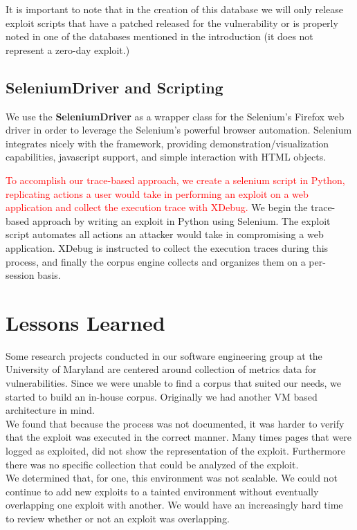 \documentclass[letterpaper,twocolumn,10pt]{article}
\begin{document}
It is important to note that in the creation of this database we will only release exploit scripts that have a patched released for the vulnerability or is properly noted in one of the databases mentioned in the introduction (it does not represent a zero-day exploit.)


\subsection{{\bf SeleniumDriver} and Scripting}
We use the {\bf SeleniumDriver} as a wrapper class for the Selenium's Firefox web driver in order to leverage the Selenium's powerful browser automation.  Selenium integrates nicely with the framework, providing demonstration/visualization capabilities, javascript support, and simple interaction with HTML objects.

\textcolor{red}{To accomplish our trace-based approach, we create a selenium script in Python, replicating actions a user would take in performing an exploit on a web application and collect the execution trace with XDebug.}
We begin the trace-based approach by writing an exploit in Python using Selenium. The exploit script automates all actions an attacker would take in compromising a web application. XDebug is instructed to collect the execution traces during this process, and finally the corpus engine collects and organizes them on a per-session basis.


\section{Lessons Learned}

Some research projects conducted in our software engineering group at the University of Maryland are centered around collection of metrics data for vulnerabilities.  Since we were unable to find a corpus that suited our needs, we started to build an in-house corpus.  Originally we had another VM based architecture in mind. \\

We found that because the process was not documented, it was harder to verify that the exploit was executed in the correct manner.  Many times pages that were logged as exploited, did not show the representation of the exploit.  Furthermore there was no specific collection that could be analyzed of the exploit.\\

We determined that, for one, this environment was not scalable.  We could not continue to add new exploits to a tainted environment without eventually overlapping one exploit with another.  We would have an increasingly hard time to review whether or not an exploit was overlapping.\\
\end{document}
